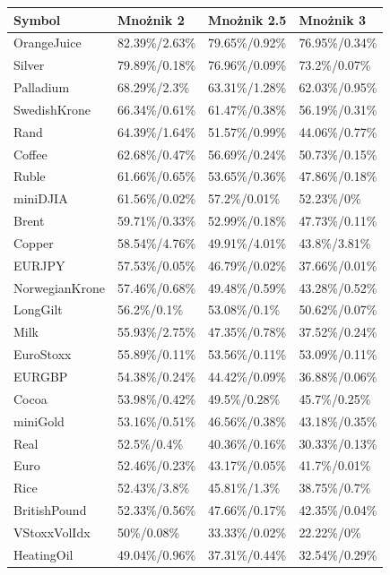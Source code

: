 \documentclass[a4paper,12pt,openany, DIV=calc, headsepline]{scrbook}
\begin{document}
\begin{longtable}{llll}
  \hline
Symbol & Mnożnik 2 & Mnożnik 2.5 & Mnożnik 3 \\ 
  \hline
 OrangeJuice & 82.39\%/2.63\% & 79.65\%/0.92\% & 76.95\%/0.34\% \\ 
  Silver & 79.89\%/0.18\% & 76.96\%/0.09\% & 73.2\%/0.07\% \\ 
  Palladium & 68.29\%/2.3\% & 63.31\%/1.28\% & 62.03\%/0.95\% \\ 
  SwedishKrone & 66.34\%/0.61\% & 61.47\%/0.38\% & 56.19\%/0.31\% \\ 
  Rand & 64.39\%/1.64\% & 51.57\%/0.99\% & 44.06\%/0.77\% \\ 
  Coffee & 62.68\%/0.47\% & 56.69\%/0.24\% & 50.73\%/0.15\% \\ 
  Ruble & 61.66\%/0.65\% & 53.65\%/0.36\% & 47.86\%/0.18\% \\ 
  miniDJIA & 61.56\%/0.02\% & 57.2\%/0.01\% & 52.23\%/0\% \\ 
  Brent & 59.71\%/0.33\% & 52.99\%/0.18\% & 47.73\%/0.11\% \\ 
  Copper & 58.54\%/4.76\% & 49.91\%/4.01\% & 43.8\%/3.81\% \\ 
  EURJPY & 57.53\%/0.05\% & 46.79\%/0.02\% & 37.66\%/0.01\% \\ 
  NorwegianKrone & 57.46\%/0.68\% & 49.48\%/0.59\% & 43.28\%/0.52\% \\ 
  LongGilt & 56.2\%/0.1\% & 53.08\%/0.1\% & 50.62\%/0.07\% \\ 
  Milk & 55.93\%/2.75\% & 47.35\%/0.78\% & 37.52\%/0.24\% \\ 
  EuroStoxx & 55.89\%/0.11\% & 53.56\%/0.11\% & 53.09\%/0.11\% \\ 
  EURGBP & 54.38\%/0.24\% & 44.42\%/0.09\% & 36.88\%/0.06\% \\ 
  Cocoa & 53.98\%/0.42\% & 49.5\%/0.28\% & 45.7\%/0.25\% \\ 
  miniGold & 53.16\%/0.51\% & 46.56\%/0.38\% & 43.18\%/0.35\% \\ 
  Real & 52.5\%/0.4\% & 40.36\%/0.16\% & 30.33\%/0.13\% \\ 
  Euro & 52.46\%/0.23\% & 43.17\%/0.05\% & 41.7\%/0.01\% \\ 
  Rice & 52.43\%/3.8\% & 45.81\%/1.3\% & 38.75\%/0.7\% \\ 
  BritishPound & 52.33\%/0.56\% & 47.66\%/0.17\% & 42.35\%/0.04\% \\ 
  VStoxxVolIdx & 50\%/0.08\% & 33.33\%/0.02\% & 22.22\%/0\% \\ 
  HeatingOil & 49.04\%/0.96\% & 37.31\%/0.44\% & 32.54\%/0.29\% \\ 

\end{longtable}
\end{document}
